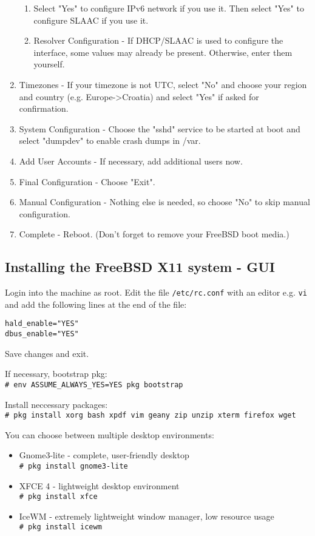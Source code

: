 \begin{enumerate}
\begin{enumerate}
	\item Select "Yes" to configure IPv6 network if you use it. Then select "Yes" to configure SLAAC if you use it.
	\item Resolver Configuration - If DHCP/SLAAC is used to configure the interface, some values may already be present. Otherwise, enter them yourself.
	\end{enumerate}
\item Timezones - If your timezone is not UTC, select "No" and choose your region and country (e.g. Europe->Croatia) and select "Yes" if asked for confirmation.
\item System Configuration - Choose the "sshd" service to be started at boot and select "dumpdev" to enable crash dumps in /var.
\item Add User Accounts - If necessary, add additional users now.
\item Final Configuration - Choose "Exit".
\item Manual Configuration - Nothing else is needed, so choose "No" to skip manual configuration.
\item Complete - Reboot. (Don't forget to remove your FreeBSD boot media.)
\end{enumerate}

\subsection{Installing the FreeBSD X11 system - GUI}

Login into the machine as root. Edit the file \texttt{/etc/rc.conf} with an editor e.g.
\texttt{vi} and add the following lines at the end of the file:
\begin{verbatim}
hald_enable="YES"
dbus_enable="YES"
\end{verbatim}
Save changes and exit.

If necessary, bootstrap pkg:\\
\texttt{\# env ASSUME\_ALWAYS\_YES=YES pkg bootstrap}

Install neccessary packages:\\
\texttt{\# pkg install xorg bash xpdf vim geany zip unzip xterm firefox wget}

You can choose between multiple desktop environments:
\begin{itemize}
\item Gnome3-lite - complete, user-friendly desktop\\
\texttt{\# pkg install gnome3-lite}
\item XFCE 4 - lightweight desktop environment\\
\texttt{\# pkg install xfce}
\item IceWM - extremely lightweight window manager, low resource usage\\
\texttt{\# pkg install icewm}
\end{itemize}

